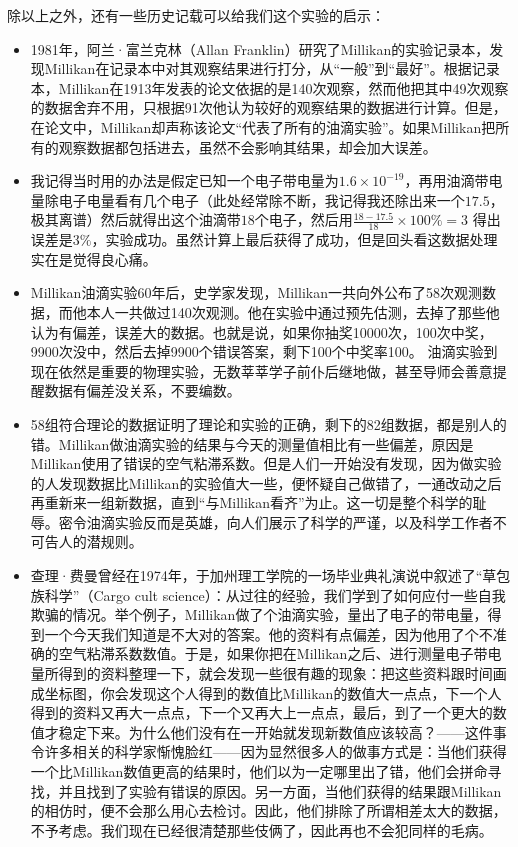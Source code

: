 \documentclass[dvipsnames, svgnames,a4paper,11pt]{article}
\begin{document}
	除以上之外，还有一些历史记载可以给我们这个实验的启示：
	\begin{itemize}
		\item 1981年，阿兰·富兰克林（Allan Franklin）研究了Millikan的实验记录本，发现Millikan在记录本中对其观察结果进行打分，从“一般”到“最好”。根据记录本，Millikan在1913年发表的论文依据的是140次观察，然而他把其中49次观察的数据舍弃不用，只根据91次他认为较好的观察结果的数据进行计算。但是，在论文中，Millikan却声称该论文“代表了所有的油滴实验”。如果Millikan把所有的观察数据都包括进去，虽然不会影响其结果，却会加大误差。
		
		\item 我记得当时用的办法是假定已知一个电子带电量为$1.6\times 10^{-19}$，再用油滴带电量除电子电量看有几个电子（此处经常除不断，我记得我还除出来一个$17.5$，极其离谱）然后就得出这个油滴带$18$个电子，然后用$\frac{18-17.5}{18}\times 100\%=3$
		得出误差是$3\%$，实验成功。虽然计算上最后获得了成功，但是回头看这数据处理实在是觉得良心痛。
		
		\item Millikan油滴实验60年后，史学家发现，Millikan一共向外公布了58次观测数据，而他本人一共做过140次观测。他在实验中通过预先估测，去掉了那些他认为有偏差，误差大的数据。也就是说，如果你抽奖10000次，100次中奖，9900次没中，然后去掉9900个错误答案，剩下100个中奖率100。
		油滴实验到现在依然是重要的物理实验，无数莘莘学子前仆后继地做，甚至导师会善意提醒数据有偏差没关系，不要编数。
		
		\item 58组符合理论的数据证明了理论和实验的正确，剩下的82组数据，都是别人的错。Millikan做油滴实验的结果与今天的测量值相比有一些偏差，原因是Millikan使用了错误的空气粘滞系数。但是人们一开始没有发现，因为做实验的人发现数据比Millikan的实验值大一些，便怀疑自己做错了，一通改动之后再重新来一组新数据，直到“与Millikan看齐”为止。这一切是整个科学的耻辱。密令油滴实验反而是英雄，向人们展示了科学的严谨，以及科学工作者不可告人的潜规则。
		
		\item 查理·费曼曾经在1974年，于加州理工学院的一场毕业典礼演说中叙述了“草包族科学”（Cargo cult science）：从过往的经验，我们学到了如何应付一些自我欺骗的情况。举个例子，Millikan做了个油滴实验，量出了电子的带电量，得到一个今天我们知道是不大对的答案。他的资料有点偏差，因为他用了个不准确的空气粘滞系数数值。于是，如果你把在Millikan之后、进行测量电子带电量所得到的资料整理一下，就会发现一些很有趣的现象：把这些资料跟时间画成坐标图，你会发现这个人得到的数值比Millikan的数值大一点点，下一个人得到的资料又再大一点点，下一个又再大上一点点，最后，到了一个更大的数值才稳定下来。为什么他们没有在一开始就发现新数值应该较高？——这件事令许多相关的科学家惭愧脸红——因为显然很多人的做事方式是：当他们获得一个比Millikan数值更高的结果时，他们以为一定哪里出了错，他们会拼命寻找，并且找到了实验有错误的原因。另一方面，当他们获得的结果跟Millikan的相仿时，便不会那么用心去检讨。因此，他们排除了所谓相差太大的数据，不予考虑。我们现在已经很清楚那些伎俩了，因此再也不会犯同样的毛病。
	\end{itemize}
	
\end{document}
